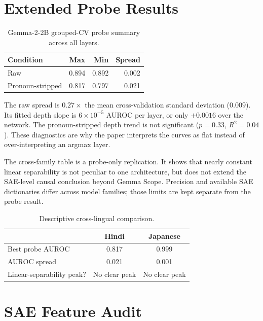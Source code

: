 \documentclass[10pt]{article}
\begin{document}
\section{Extended Probe Results}

\begin{table}[H]
\centering
\small
\begin{tabular}{lrrr}
\toprule
\textbf{Condition} & \textbf{Max} & \textbf{Min} & \textbf{Spread} \\
\midrule
Raw & 0.894 & 0.892 & 0.002 \\
Pronoun-stripped & 0.817 & 0.797 & 0.021 \\
\bottomrule
\end{tabular}
\caption{Gemma-2-2B grouped-CV probe summary across all layers.}
\label{tab:probe-summary}
\end{table}

The raw spread is $0.27\times$ the mean cross-validation standard deviation
($0.009$). Its fitted depth slope is $6\times10^{-5}$ AUROC per layer, or only
$+0.0016$ over the network. The pronoun-stripped depth trend is not significant
($p=0.33$, $R^2=0.04$). These diagnostics are why the paper interprets the
curves as flat instead of over-interpreting an argmax layer.



The cross-family table is a probe-only replication. It shows that nearly
constant linear separability is not peculiar to one architecture, but
does not extend the SAE-level causal conclusion beyond Gemma Scope. Precision
and available SAE dictionaries differ across model families; those limits are
kept separate from the probe result.

\begin{table}[H]
\centering
\small
\begin{tabular}{lcc}
\toprule
& \textbf{Hindi} & \textbf{Japanese} \\
\midrule
Best probe AUROC & 0.817 & 0.999 \\
AUROC spread & 0.021 & 0.001 \\
Linear-separability peak? & No clear peak & No clear peak \\
\bottomrule
\end{tabular}
\caption{Descriptive cross-lingual comparison.}
\label{tab:crosslingual}
\end{table}
\FloatBarrier

\section{SAE Feature Audit}
\end{document}
